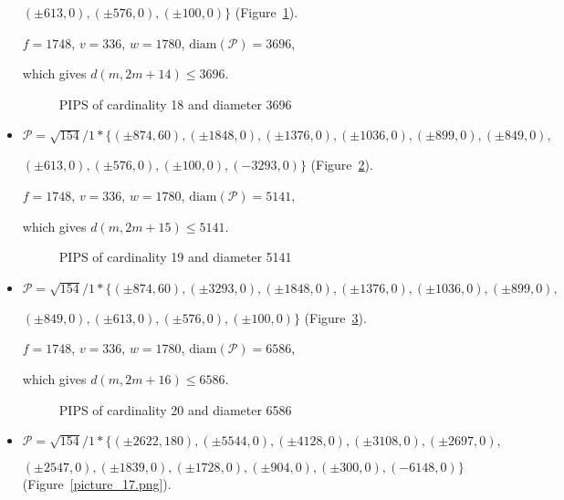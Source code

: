 \documentclass[12pt]{article}
\theoremstyle{theorem}
\theoremstyle{dfn}
\theoremstyle{remark}
\begin{document}
\begin{itemize}
$
(\pm 613 , 0),
(\pm 576 , 0),
(\pm 100 , 0)\}
$
(Figure~\ref{picture_14.png}).

$f = 1748$, $v = 336$, $w = 1780$, $\operatorname{diam(\mathcal{P})} = 3696$,

which gives $d(m, 2m + 14) \leq 3696$.


\begin{figure}[h!]
\parbox{0.85\linewidth}{\caption{PIPS of cardinality 18 and diameter 3696}
\label{picture_14.png}}
\end{figure}


\item
$\mathcal{P}=\sqrt{154}/{1} * \{ (\pm 874, 60),
(\pm 1848 , 0),
(\pm 1376 , 0),
(\pm 1036 , 0),
(\pm 899 , 0),
(\pm 849 , 0),
$

$
(\pm 613 , 0),
(\pm 576 , 0),
(\pm 100 , 0),
(-3293 , 0)\}
$
(Figure~\ref{picture_15.png}).

$f = 1748$, $v = 336$, $w = 1780$, $\operatorname{diam(\mathcal{P})} = 5141$,

which gives $d(m, 2m + 15) \leq 5141$.


\begin{figure}[h!]
\parbox{1\linewidth}{\caption{PIPS of cardinality 19 and diameter 5141}
\label{picture_15.png}}
\end{figure}


\item
$\mathcal{P}=\sqrt{154}/{1} * \{ (\pm 874, 60),
(\pm 3293 , 0),
(\pm 1848 , 0),
(\pm 1376 , 0),
(\pm 1036 , 0),
(\pm 899 , 0),
$

$
(\pm 849 , 0),
(\pm 613 , 0),
(\pm 576 , 0),
(\pm 100 , 0)\}
$
(Figure~\ref{picture_16.png}).

$f = 1748$, $v = 336$, $w = 1780$, $\operatorname{diam(\mathcal{P})} = 6586$,

which gives $d(m, 2m + 16) \leq 6586$.


\begin{figure}[h!]
\parbox{1\linewidth}{\caption{PIPS of cardinality 20 and diameter 6586}
\label{picture_16.png}}
\end{figure}


\item
$\mathcal{P}=\sqrt{154}/{1} * \{ (\pm 2622, 180),
(\pm 5544 , 0),
(\pm 4128 , 0),
(\pm 3108 , 0),
(\pm 2697 , 0),
$

$
(\pm 2547 , 0),
(\pm 1839 , 0),
(\pm 1728 , 0),
(\pm 904 , 0),
(\pm 300 , 0),
(-6148 , 0)\}
$
(Figure~\ref{picture_17.png}).


\end{itemize}
\end{document}
